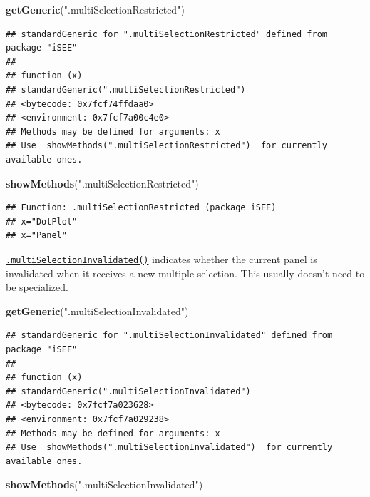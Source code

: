 \documentclass[
]{book}
\newenvironment{Shaded}{\begin{snugshade}}{\end{snugshade}}
\newcommand{\KeywordTok}[1]{\textcolor[rgb]{0.13,0.29,0.53}{\textbf{#1}}}
\newcommand{\NormalTok}[1]{#1}
\newcommand{\StringTok}[1]{\textcolor[rgb]{0.31,0.60,0.02}{#1}}
\begin{document}
\begin{Shaded}
\begin{Highlighting}[]
\KeywordTok{getGeneric}\NormalTok{(}\StringTok{".multiSelectionRestricted"}\NormalTok{)}
\end{Highlighting}
\end{Shaded}

\begin{verbatim}
## standardGeneric for ".multiSelectionRestricted" defined from package "iSEE"
## 
## function (x) 
## standardGeneric(".multiSelectionRestricted")
## <bytecode: 0x7fcf74ffdaa0>
## <environment: 0x7fcf7a00c4e0>
## Methods may be defined for arguments: x
## Use  showMethods(".multiSelectionRestricted")  for currently available ones.
\end{verbatim}

\begin{Shaded}
\begin{Highlighting}[]
\KeywordTok{showMethods}\NormalTok{(}\StringTok{".multiSelectionRestricted"}\NormalTok{)}
\end{Highlighting}
\end{Shaded}

\begin{verbatim}
## Function: .multiSelectionRestricted (package iSEE)
## x="DotPlot"
## x="Panel"
\end{verbatim}

\href{https://isee.github.io/iSEE/reference/multi-select-generics.html}{\texttt{.multiSelectionInvalidated()}} indicates whether the current panel is invalidated when it receives a new multiple selection.
This usually doesn't need to be specialized.

\begin{Shaded}
\begin{Highlighting}[]
\KeywordTok{getGeneric}\NormalTok{(}\StringTok{".multiSelectionInvalidated"}\NormalTok{)}
\end{Highlighting}
\end{Shaded}

\begin{verbatim}
## standardGeneric for ".multiSelectionInvalidated" defined from package "iSEE"
## 
## function (x) 
## standardGeneric(".multiSelectionInvalidated")
## <bytecode: 0x7fcf7a023628>
## <environment: 0x7fcf7a029238>
## Methods may be defined for arguments: x
## Use  showMethods(".multiSelectionInvalidated")  for currently available ones.
\end{verbatim}

\begin{Shaded}
\begin{Highlighting}[]
\KeywordTok{showMethods}\NormalTok{(}\StringTok{".multiSelectionInvalidated"}\NormalTok{)}
\end{Highlighting}
\end{Shaded}
\end{document}
